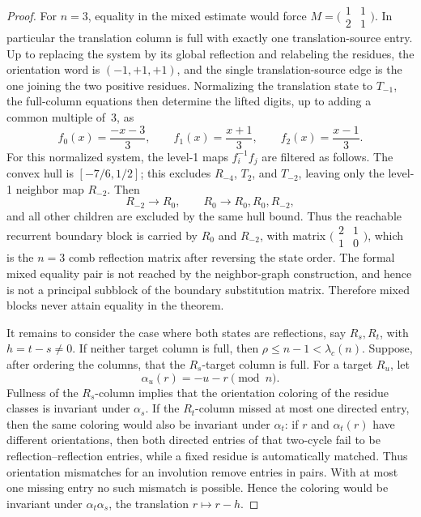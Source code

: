 \documentclass{amsart}
\theoremstyle{definition}
\theoremstyle{remark}
\begin{document}
\begin{proof}
For \(n=3\), equality in the mixed estimate would force
\(M=\bigl(\begin{smallmatrix}1&1\\2&1\end{smallmatrix}\bigr)\).  In
particular the translation column is full with exactly one
translation-source entry.  Up to replacing the system by its global
reflection and relabeling the residues, the orientation word is
\((-1,+1,+1)\), and the single translation-source edge is the one joining
the two positive residues.  Normalizing the translation state to
\(T_{-1}\), the full-column equations then determine the lifted digits,
up to adding a common multiple of~\(3\), as
\[
  f_0(x)=\frac{-x-3}{3},
  \qquad
  f_1(x)=\frac{x+1}{3},
  \qquad
  f_2(x)=\frac{x-1}{3}.
\]
For this normalized system, the level-1 maps \(f_i^{-1}f_j\) are
filtered as follows.  The convex hull is \([-7/6,1/2]\); this excludes
\(R_{-4}\), \(T_2\), and \(T_{-2}\), leaving only the level-1 neighbor
map \(R_{-2}\).
Then
\[
  R_{-2}\longrightarrow R_0,
  \qquad
  R_0\longrightarrow R_0,R_0,R_{-2},
\]
and all other children are excluded by the same hull bound.  Thus the
reachable recurrent boundary block is carried by \(R_0\) and \(R_{-2}\),
with matrix \(\bigl(\begin{smallmatrix}2&1\\1&0\end{smallmatrix}\bigr)\),
which is the \(n=3\) comb reflection matrix after reversing the state
order.  The formal mixed equality pair is not reached by the
neighbor-graph construction, and hence is not a principal subblock of
the boundary substitution matrix.  Therefore mixed blocks never attain
equality in the theorem.

It remains to consider the case where both states are reflections,
say \(R_s,R_t\), with \(h=t-s\ne0\).  If neither target column is full,
then \(\rho\le n-1<\lambda_c(n)\).  Suppose, after ordering the columns,
that the \(R_s\)-target column is full.  For a target \(R_u\), let
\[
  \alpha_u(r)=-u-r\pmod n.
\]
Fullness of the \(R_s\)-column implies that the orientation coloring of
the residue classes is invariant under \(\alpha_s\).  If the
\(R_t\)-column missed at most one directed entry, then the same coloring
would also be invariant under \(\alpha_t\): if \(r\) and
\(\alpha_t(r)\) have different orientations, then both directed entries
of that two-cycle fail to be reflection--reflection entries, while a
fixed residue is automatically matched.  Thus orientation mismatches for
an involution remove entries in pairs.  With at most one missing entry no
such mismatch is possible.  Hence the coloring would be invariant under
\(\alpha_t\alpha_s\), the translation \(r\mapsto r-h\).


\end{proof}
\end{document}
